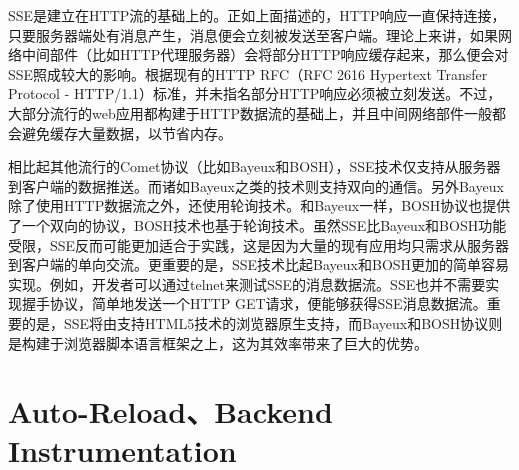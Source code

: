 SSE是建立在HTTP流的基础上的。正如上面描述的，HTTP响应一直保持连接，只要服务器端处有消息产生，消息便会立刻被发送至客户端。理论上来讲，如果网络中间部件（比如HTTP代理服务器）会将部分HTTP响应缓存起来，那么便会对SSE照成较大的影响。根据现有的HTTP RFC（RFC 2616 Hypertext Transfer Protocol - HTTP/1.1）标准，并未指名部分HTTP响应必须被立刻发送。不过，大部分流行的web应用都构建于HTTP数据流的基础上，并且中间网络部件一般都会避免缓存大量数据，以节省内存。

相比起其他流行的Comet协议（比如Bayeux和BOSH），SSE技术仅支持从服务器到客户端的数据推送。而诸如Bayeux之类的技术则支持双向的通信。另外Bayeux除了使用HTTP数据流之外，还使用轮询技术。和Bayeux一样，BOSH协议也提供了一个双向的协议，BOSH技术也基于轮询技术。虽然SSE比Bayeux和BOSH功能受限，SSE反而可能更加适合于实践，这是因为大量的现有应用均只需求从服务器到客户端的单向交流。更重要的是，SSE技术比起Bayeux和BOSH更加的简单容易实现。例如，开发者可以通过telnet来测试SSE的消息数据流。SSE也并不需要实现握手协议，简单地发送一个HTTP GET请求，便能够获得SSE消息数据流。重要的是，SSE将由支持HTML5技术的浏览器原生支持，而Bayeux和BOSH协议则是构建于浏览器脚本语言框架之上，这为其效率带来了巨大的优势。

\section{Auto-Reload、Backend Instrumentation}
















